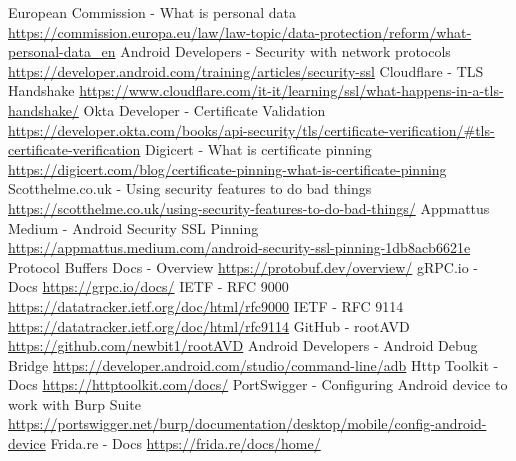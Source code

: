 \documentclass[a4paper, binding=0.6cm, noexaminfo, english]{sapthesis}
\begin{document}
		\begin{thebibliography}{99}
			 European Commission - What is personal data \newline
			\url{https://commission.europa.eu/law/law-topic/data-protection/reform/what-personal-data_en}
			 Android Developers - Security with network protocols \newline
			\url{https://developer.android.com/training/articles/security-ssl}
			 Cloudflare - TLS Handshake \newline
			\url{https://www.cloudflare.com/it-it/learning/ssl/what-happens-in-a-tls-handshake/}
			 Okta Developer - Certificate Validation \newline
			\url{https://developer.okta.com/books/api-security/tls/certificate-verification/#tls-certificate-verification}	
			 Digicert - What is certificate pinning \newline
			\url{https://digicert.com/blog/certificate-pinning-what-is-certificate-pinning}				
			 Scotthelme.co.uk - Using security features to do bad things \newline
			\url{https://scotthelme.co.uk/using-security-features-to-do-bad-things/}
			 Appmattus Medium - Android Security SSL Pinning \newline
			\url{https://appmattus.medium.com/android-security-ssl-pinning-1db8acb6621e}	
			 Protocol Buffers Docs - Overview \newline
			\url{https://protobuf.dev/overview/}
			 gRPC.io - Docs \newline
			\url{https://grpc.io/docs/}
			 IETF - RFC 9000 \newline
			\url{https://datatracker.ietf.org/doc/html/rfc9000}
			 IETF - RFC 9114 \newline
			\url{https://datatracker.ietf.org/doc/html/rfc9114}
			 GitHub - rootAVD \newline
			\url{https://github.com/newbit1/rootAVD}
			 Android Developers - Android Debug Bridge \newline
			\url{https://developer.android.com/studio/command-line/adb}
			 Http Toolkit - Docs \newline
			\url{https://httptoolkit.com/docs/}
			 PortSwigger - Configuring Android device to work with Burp Suite\newline
			\url{https://portswigger.net/burp/documentation/desktop/mobile/config-android-device}
			 Frida.re - Docs\newline
			\url{https://frida.re/docs/home/}

		\end{thebibliography}
\end{document}
